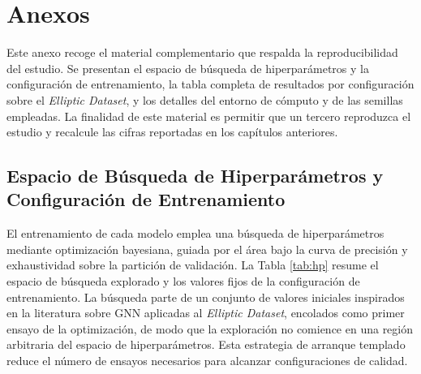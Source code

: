 \chapter{Anexos}

Este anexo recoge el material complementario que respalda la reproducibilidad del estudio. Se presentan el espacio de búsqueda de hiperparámetros y la configuración de entrenamiento, la tabla completa de resultados por configuración sobre el \textit{Elliptic Dataset}, y los detalles del entorno de cómputo y de las semillas empleadas. La finalidad de este material es permitir que un tercero reproduzca el estudio y recalcule las cifras reportadas en los capítulos anteriores.

\section{Espacio de Búsqueda de Hiperparámetros y Configuración de Entrenamiento}

El entrenamiento de cada modelo emplea una búsqueda de hiperparámetros mediante optimización bayesiana, guiada por el área bajo la curva de precisión y exhaustividad sobre la partición de validación. La Tabla \ref{tab:hp} resume el espacio de búsqueda explorado y los valores fijos de la configuración de entrenamiento. La búsqueda parte de un conjunto de valores iniciales inspirados en la literatura sobre GNN aplicadas al \textit{Elliptic Dataset}, encolados como primer ensayo de la optimización, de modo que la exploración no comience en una región arbitraria del espacio de hiperparámetros. Esta estrategia de arranque templado reduce el número de ensayos necesarios para alcanzar configuraciones de calidad.

